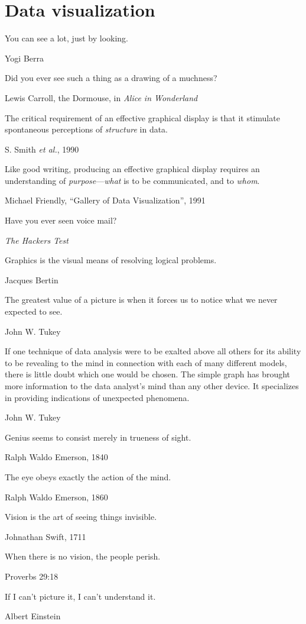 
\section{Data visualization}

\epigraph{You can see a lot, just by looking.}{Yogi Berra}

\epigraph{Did you ever see such a thing as a drawing of a muchness?}{Lewis Carroll, the Dormouse, in \emph{Alice in Wonderland}}

\epigraph{The critical requirement of an effective graphical display is that it stimulate spontaneous perceptions of \emph{structure} in data.}{S. Smith \emph{et al.}, 1990}

\epigraph{Like good writing, producing an effective graphical display requires an understanding of \emph{purpose}---\emph{what} is to be communicated, and to \emph{whom}.}{Michael Friendly, ``Gallery of Data Visualization'', 1991}

\epigraph{Have you ever seen voice mail?}{\emph{The Hackers Test}}

\epigraph{Graphics is the visual means of resolving logical problems.}{Jacques Bertin \citet[p. 16]{Bertin:81}}

\epigraph{The greatest value of a picture is when it forces us to notice what we never expected to see.}{John W. Tukey \citet[p. vi]{Tukey:77}}

\epigraph{If one technique of data analysis were to be exalted above all others for its ability to be revealing to the mind in connection with each of many different models, there is little doubt which one would be chosen. The simple graph has brought more information to the data analyst's mind than any other device. It specializes in providing indications of unexpected phenomena.}{John W. Tukey \citet[p. 49]{Tukey:1962}}
 
\epigraph{Genius seems to consist merely in trueness of sight.}{Ralph Waldo Emerson, 1840}

\epigraph{The eye obeys exactly the action of the mind.}{Ralph Waldo Emerson, 1860}

\epigraph{Vision is the art of seeing things invisible.}{Johnathan Swift, 1711}

\epigraph{When there is no vision, the people perish.}{Proverbs 29:18}

\epigraph{If I can't picture it, I can't understand it.}{Albert Einstein}

